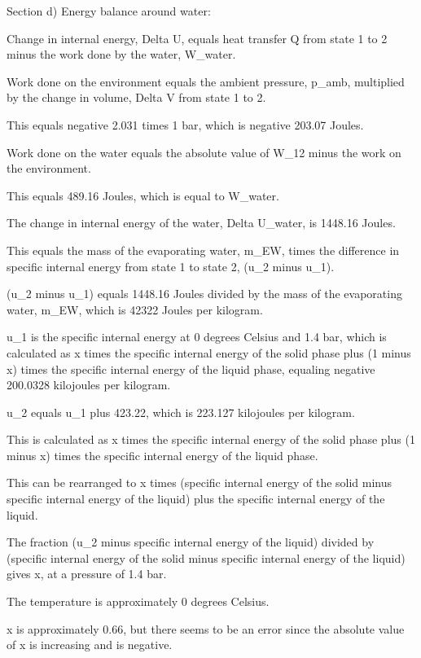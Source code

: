 Section d) Energy balance around water:

Change in internal energy, Delta U, equals heat transfer Q from state 1 to 2 minus the work done by the water, W_water.

Work done on the environment equals the ambient pressure, p_amb, multiplied by the change in volume, Delta V from state 1 to 2.

This equals negative 2.031 times 1 bar, which is negative 203.07 Joules.

Work done on the water equals the absolute value of W_12 minus the work on the environment.

This equals 489.16 Joules, which is equal to W_water.

The change in internal energy of the water, Delta U_water, is 1448.16 Joules.

This equals the mass of the evaporating water, m_EW, times the difference in specific internal energy from state 1 to state 2, (u_2 minus u_1).

(u_2 minus u_1) equals 1448.16 Joules divided by the mass of the evaporating water, m_EW, which is 42322 Joules per kilogram.

u_1 is the specific internal energy at 0 degrees Celsius and 1.4 bar, which is calculated as x times the specific internal energy of the solid phase plus (1 minus x) times the specific internal energy of the liquid phase, equaling negative 200.0328 kilojoules per kilogram.

u_2 equals u_1 plus 423.22, which is 223.127 kilojoules per kilogram.

This is calculated as x times the specific internal energy of the solid phase plus (1 minus x) times the specific internal energy of the liquid phase.

This can be rearranged to x times (specific internal energy of the solid minus specific internal energy of the liquid) plus the specific internal energy of the liquid.

The fraction (u_2 minus specific internal energy of the liquid) divided by (specific internal energy of the solid minus specific internal energy of the liquid) gives x, at a pressure of 1.4 bar.

The temperature is approximately 0 degrees Celsius.

x is approximately 0.66, but there seems to be an error since the absolute value of x is increasing and is negative.